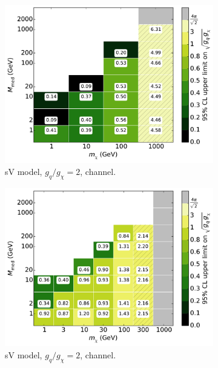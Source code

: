 \begin{figure}
  \centering
  \begin{subfigure}[t]{0.32\textwidth}
    \centering
    \includegraphics[width=1.\textwidth]{figures/grid_basepoints_SVD_rat2_monojet.pdf}
    \caption{sV model, $g_q/g_{\chi} = 2$, \monojet channel.}
  \end{subfigure}
  \begin{subfigure}[t]{0.32\textwidth}
    \centering
    \includegraphics[width=1.\textwidth]{figures/grid_allpoints_SVD_rat2.pdf}
    \caption{sV model, $g_q/g_{\chi} = 2$, \monoZ channel.}
  \end{subfigure}
  \begin{subfigure}[t]{0.32\textwidth}

\end{subfigure}
\end{figure}
